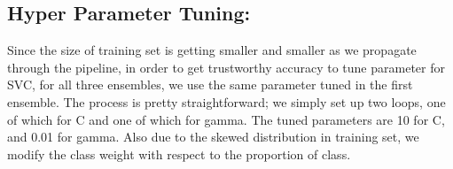 	\subsection{Hyper Parameter Tuning:}
		Since the size of training set is getting smaller and smaller as we propagate through the pipeline, in order to get trustworthy accuracy to tune parameter for SVC, for all three ensembles, we use the same parameter tuned in the first ensemble. The process is pretty straightforward; we simply set up two loops, one of which for C and one of which for gamma. The tuned parameters are 10 for C, and 0.01 for gamma. Also due to the skewed distribution in training set, we modify the class weight with respect to the proportion of class. 

